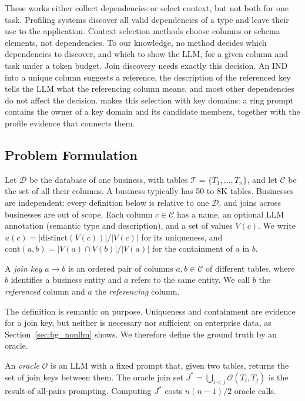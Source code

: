  These works either collect dependencies or select context, but not both for one task.
Profiling systems discover all valid dependencies of a type and leave their use to the application.
Context selection methods choose columns or schema elements, not dependencies.
To our knowledge, no method decides which dependencies to discover, and which to show the LLM, for a given column and task under a token budget.
Join discovery needs exactly this decision.
An IND into a unique column suggests a reference, the description of the referenced key tells the LLM what the referencing column means, and most other dependencies do not affect the decision.
\ourmethod makes this selection with key domains: a ring prompt contains the owner of a key domain and its candidate members, together with the profile evidence that connects them.

\subsection{Problem Formulation}
\label{sec:problem}
Let $\mathcal{D}$ be the database of one business, with tables $\mathcal{T} = \{T_1, \ldots, T_n\}$, and let $\mathcal{C}$ be the set of all their columns.
A business typically has 50 to 8K tables.
Businesses are independent: every definition below is relative to one $\mathcal{D}$, and joins across businesses are out of scope.
Each column $c \in \mathcal{C}$ has a name, an optional LLM annotation (semantic type and description), and a set of values $V(c)$.
We write $u(c) = |\mathrm{distinct}(V(c))| / |V(c)|$ for its uniqueness, and $\mathrm{cont}(a, b) = |V(a) \cap V(b)| / |V(a)|$ for the containment of $a$ in $b$.

\begin{definition}
A \emph{join key} $a \rightarrow b$ is an ordered pair of columns $a, b \in \mathcal{C}$ of different tables, where $b$ identifies a business entity and $a$ refers to the same entity.
We call $b$ the \emph{referenced} column and $a$ the \emph{referencing} column.
\end{definition}

The definition is semantic on purpose.
Uniqueness and containment are evidence for a join key, but neither is necessary nor sufficient on enterprise data, as Section~\ref{sec:bg_nonllm} shows.
We therefore define the ground truth by an oracle.

\begin{definition}
An \emph{oracle} $\mathcal{O}$ is an LLM with a fixed prompt that, given two tables, returns the set of join keys between them.
The oracle join set $J^* = \bigcup_{i<j} \mathcal{O}(T_i, T_j)$ is the result of all-pairs prompting.
Computing $J^*$ costs $n(n-1)/2$ oracle calls.
\end{definition}

